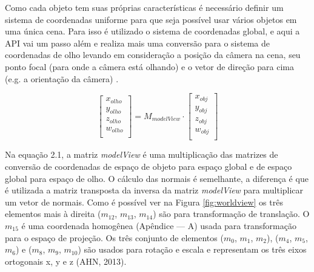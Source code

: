 Como cada objeto tem suas próprias características é necessário definir um sistema de coordenadas uniforme para que seja possível usar vários objetos em uma única cena. Para isso é utilizado o sistema de coordenadas global, e aqui a API vai um passo além e realiza mais uma conversão para o sistema de coordenadas de olho levando em consideração a posição da câmera na cena, seu ponto focal (para onde a câmera está olhando) e o vetor de direção para cima (e.g. a orientação da câmera) \cite{GLSLBook}. 

	\begin{equation}
		\begin{bmatrix}
			x_{olho} \\
			y_{olho} \\
			z_{olho} \\
			w_{olho} \\
		\end{bmatrix}
		=
		M_{modelView} \cdot
		\begin{bmatrix}
			x_{obj} \\
			y_{obj} \\
			z_{obj} \\
			w_{obj} \\
		\end{bmatrix}
	\end{equation}

	\begin{figure}[h!]
		\centering
	\end{figure}

Na equação 2.1, a matriz \textit{modelView} é uma multiplicação das matrizes de conversão de coordenadas de espaço de objeto para espaço global e de espaço global para espaço de olho. O cálculo das normais é semelhante, a diferença é que é utilizada a matriz transposta da inversa da matriz \textit{modelView} para multiplicar um vetor de normais. Como é possível ver na Figura \ref{fig:worldview} os três elementos mais à direita ($ m_{12} $, $ m_{13} $, $ m_{14} $) são para transformação de translação. O $ m_{15} $ é uma coordenada homogênea (Apêndice --- A) usada para transformação para o espaço de projeção. Os três conjunto de elementos ($ m_{0} $, $ m_{1} $, $ m_{2} $), ($ m_{4} $, $ m_{5} $, $ m_{6} $) e ($ m_{8} $, $ m_{9} $, $ m_{10} $) são usados para rotação e escala e representam os três eixos ortogonais x, y e z (AHN, 2013)\nocite{openglOnline}.

